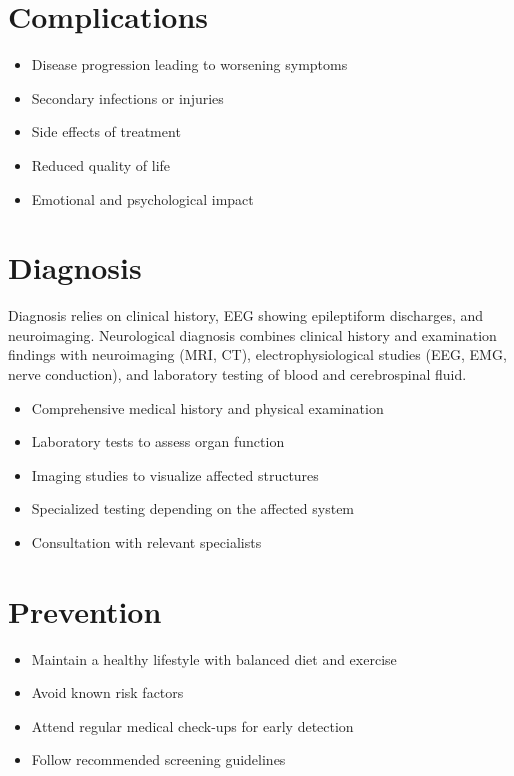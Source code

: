 \section{Complications}
\begin{itemize}[noitemsep]
  \item Disease progression leading to worsening symptoms
  \item Secondary infections or injuries
  \item Side effects of treatment
  \item Reduced quality of life
  \item Emotional and psychological impact
\end{itemize}
\section{Diagnosis}
Diagnosis relies on clinical history, EEG showing epileptiform discharges, and neuroimaging. Neurological diagnosis combines clinical history and examination findings with neuroimaging (MRI, CT), electrophysiological studies (EEG, EMG, nerve conduction), and laboratory testing of blood and cerebrospinal fluid.

\begin{itemize}[noitemsep]
  \item Comprehensive medical history and physical examination
  \item Laboratory tests to assess organ function
  \item Imaging studies to visualize affected structures
  \item Specialized testing depending on the affected system
  \item Consultation with relevant specialists
\end{itemize}
\section{Prevention}
\begin{itemize}[noitemsep]
  \item Maintain a healthy lifestyle with balanced diet and exercise
  \item Avoid known risk factors
  \item Attend regular medical check-ups for early detection
  \item Follow recommended screening guidelines
\end{itemize}
